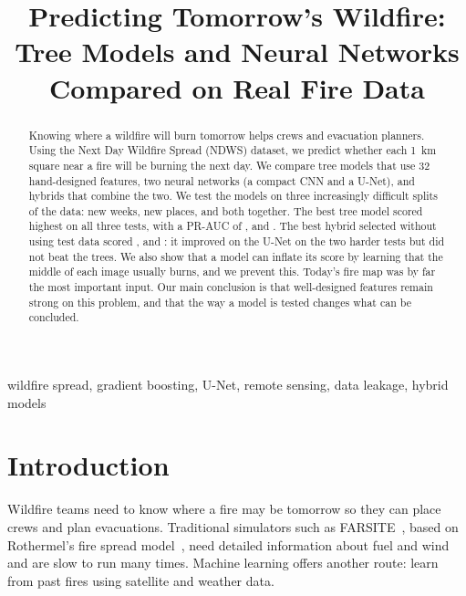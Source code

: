 \documentclass[conference]{IEEEtran}
\begin{document}
\title{Predicting Tomorrow's Wildfire:\\ Tree Models and Neural Networks Compared on Real Fire Data}

\author{
}

\maketitle

\begin{abstract}
Knowing where a wildfire will burn tomorrow helps crews and evacuation planners. Using the Next Day Wildfire Spread (NDWS) dataset, we predict whether each \SI{1}{km} square near a fire will be burning the next day. We compare tree models that use 32 hand-designed features, two neural networks (a compact CNN and a U-Net), and hybrids that combine the two. We test the models on three increasingly difficult splits of the data: new weeks, new places, and both together. The best tree model scored highest on all three tests, with a PR-AUC of \rOfficialFullXgboostPr, \rSpatialFullXgboostPr{} and \rStrictFullLightgbmPr. The best hybrid selected without using test data scored \rOfficialFullHybridPr, \rSpatialFullHybridPr{} and \rStrictFullHybridPr: it improved on the U-Net on the two harder tests but did not beat the trees. We also show that a model can inflate its score by learning that the middle of each image usually burns, and we prevent this. Today's fire map was by far the most important input. Our main conclusion is that well-designed features remain strong on this problem, and that the way a model is tested changes what can be concluded.
\end{abstract}

\begin{IEEEkeywords}
wildfire spread, gradient boosting, U-Net, remote sensing, data leakage, hybrid models
\end{IEEEkeywords}

\section{Introduction}
Wildfire teams need to know where a fire may be tomorrow so they can place crews and plan evacuations. Traditional simulators such as FARSITE~\cite{finney1998farsite}, based on Rothermel's fire spread model~\cite{rothermel1972}, need detailed information about fuel and wind and are slow to run many times. Machine learning offers another route: learn from past fires using satellite and weather data.
\end{document}
